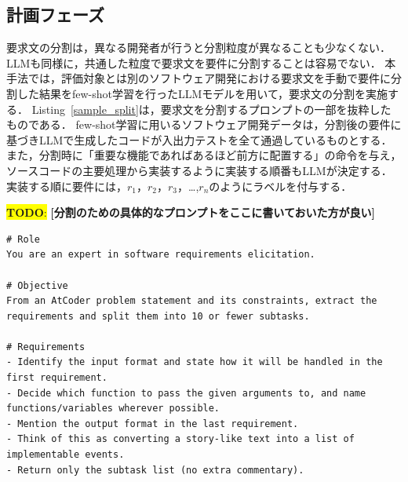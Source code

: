 \documentclass[submit,techrep,noauthor]{ipsj}
\newcommand{\todo}[1]{\colorbox{yellow}{{\bf TODO}:}{\color{red} {\textbf{[#1]}}}}
\begin{document}



\subsection{計画フェーズ}
要求文の分割は，異なる開発者が行うと分割粒度が異なることも少なくない\cite{split_size}．LLMも同様に，共通した粒度で要求文を要件に分割することは容易でない．
本手法では，評価対象とは別のソフトウェア開発における要求文を手動で要件に分割した結果をfew-shot学習を行ったLLMモデルを用いて，要求文の分割を実施する．
Listing~\ref{sample_split}は，要求文を分割するプロンプトの一部を抜粋したものである．
few-shot学習に用いるソフトウェア開発データは，分割後の要件に基づきLLMで生成したコードが入出力テストを全て通過しているものとする．
また，分割時に「重要な機能であればあるほど前方に配置する」の命令を与え，ソースコードの主要処理から実装するように実装する順番もLLMが決定する．
実装する順に要件には，$r_1$，$r_2$，$r_3$，\dots,$r_n$のようにラベルを付与する．

\todo{分割のための具体的なプロンプトをここに書いておいた方が良い}
\begin{lstlisting}[caption=要求分割のためのプロンプト（一部抜粋）, label=sample_split, captionpos=t, columns=fullflexible, breaklines=true]
# Role
You are an expert in software requirements elicitation.

# Objective
From an AtCoder problem statement and its constraints, extract the requirements and split them into 10 or fewer subtasks.

# Requirements
- Identify the input format and state how it will be handled in the first requirement.
- Decide which function to pass the given arguments to, and name functions/variables wherever possible.
- Mention the output format in the last requirement.
- Think of this as converting a story-like text into a list of implementable events.
- Return only the subtask list (no extra commentary).
\end{lstlisting}
\end{document}
